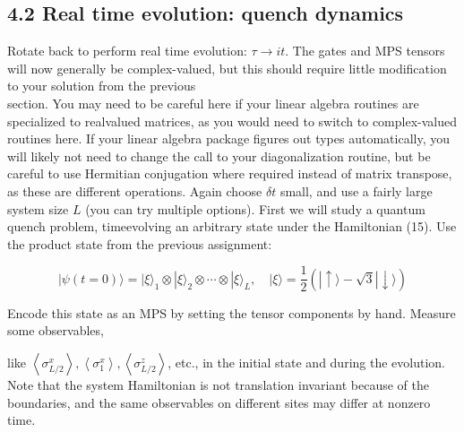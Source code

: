 \documentclass[12pt]{article}
\begin{document}
\subsection*{4.2 Real time evolution: quench dynamics}
Rotate back to perform real time evolution: $\tau \rightarrow i t$. The gates and MPS tensors will now generally be complex-valued, but this should require little modification to your solution from the previous\\
section. You may need to be careful here if your linear algebra routines are specialized to realvalued matrices, as you would need to switch to complex-valued routines here. If your linear algebra package figures out types automatically, you will likely not need to change the call to your diagonalization routine, but be careful to use Hermitian conjugation where required instead of matrix transpose, as these are different operations. Again choose $\delta t$ small, and use a fairly large system size $L$ (you can try multiple options). First we will study a quantum quench problem, timeevolving an arbitrary state under the Hamiltonian (15). Use the product state from the previous assignment:


\begin{equation*}
|\psi(t=0)\rangle=|\xi\rangle_{1} \otimes|\xi\rangle_{2} \otimes \cdots \otimes|\xi\rangle_{L}, \quad|\xi\rangle=\frac{1}{2}(|\uparrow\rangle-\sqrt{3}|\downarrow\rangle) \tag{23}
\end{equation*}


Encode this state as an MPS by setting the tensor components by hand. Measure some observables,

like $\left\langle\sigma_{L / 2}^{x}\right\rangle,\left\langle\sigma_{1}^{x}\right\rangle,\left\langle\sigma_{L / 2}^{z}\right\rangle$, etc., in the initial state and during the evolution. Note that the system Hamiltonian is not translation invariant because of the boundaries, and the same observables on different sites may differ at nonzero time.\\
\end{document}
